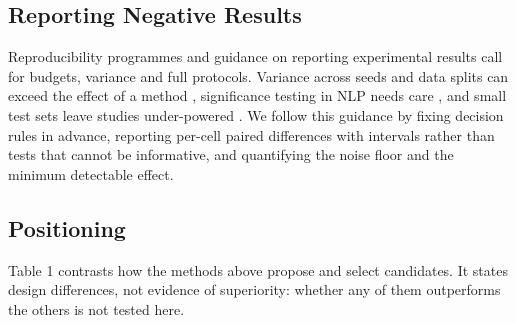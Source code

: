 \documentclass{ieeeaccess}
\begin{document}
\subsection{Reporting Negative Results}

Reproducibility programmes \cite{pineau2021} and guidance on reporting experimental results \cite{dodge2019} call for budgets, variance and full protocols. Variance across seeds and data splits can exceed the effect of a method \cite{bouthillier2021}, significance testing in NLP needs care \cite{dror2018}, and small test sets leave studies under-powered \cite{card2020}. We follow this guidance by fixing decision rules in advance, reporting per-cell paired differences with intervals rather than tests that cannot be informative, and quantifying the noise floor and the minimum detectable effect.

\subsection{Positioning}

Table 1 contrasts how the methods above propose and select candidates. It states design differences, not evidence of superiority: whether any of them outperforms the others is not tested here.
\end{document}
